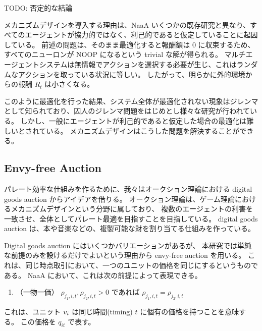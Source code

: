 TODO: 否定的な結論

メカニズムデザインを導入する理由は、NaaA いくつかの既存研究と異なり、すべてのエージェントが協力的ではなく、利己的であると仮定していることに起因している。
前述の問題は、そのまま最適化すると報酬額は 0 に収束するため、すべてのニューロンが NOOP になるという trivial な解が得られる。
マルチエージェントシステムは無情報でアクションを選択する必要が生じ、これはランダムなアクションを取っている状況に等しい。
したがって、明らかに外的環境からの報酬 $R_t$ は小さくなる。

このように最適化を行った結果、システム全体が最適化されない現象はジレンマとして知られており、囚人のジレンマ問題をはじめとし様々な研究が行われている。
しかし、一般にエージェントが利己的であると仮定した場合の最適化は難しいとされている。
メカニズムデザインはこうした問題を解決することができる。

%




\subsection{Envy-free Auction}
パレート効率な仕組みを作るために、我々はオークション理論における digital goods auction からアイデアを借りる。
オークション理論は、ゲーム理論におけるメカニズムデザインという分野に属しており、
複数のエージェントの利害を一致させ、全体としてパレート最適を目指すことを目指している。
digital goods auction は、本や音楽などの、複製可能な財を割り当てる仕組みを作っている。

Digital goods auction にはいくつかバリエーションがあるが、
本研究では単純な前提のみを設けるだけでよいという理由から envy-free auction \citep{guruswami2005profit} を用いる。
これは、同じ時点取引において、一つのユニットの価格を同じにするというものである。
NaaA において、これは次の前提によって表現できる。
\begin{enumerate}
\renewcommand{\labelenumi}{N\arabic{enumi}:}
\setcounter{enumi}{4}
\item （一物一価）
	$\rho_{j_1,i,t}, \rho_{j_2,i,t} > 0$ であれば $\rho_{j_1,i,t} = \rho_{j_2,i,t}$ 
\end{enumerate}
これは、ユニット $v_{i}$ は同じ時間(timing) $t$ に個有の価格を持つことを意味する。
この価格を $q_{it}$ で表す。

